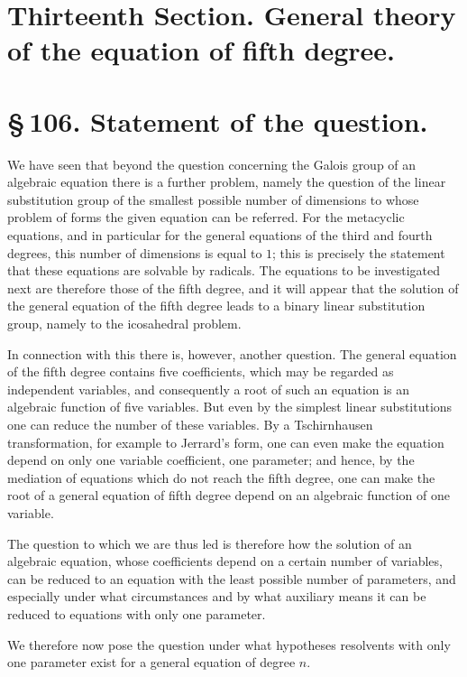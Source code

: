 \documentclass[11pt]{article}
\begin{document}
\section*{Thirteenth Section. General theory of the equation of fifth degree.}

\section*{\S\,106. Statement of the question.}

We have seen that beyond the question concerning the Galois group of an algebraic equation there is a further problem, namely the question of the linear substitution group of the smallest possible number of dimensions to whose problem of forms the given equation can be referred. For the metacyclic equations, and in particular for the general equations of the third and fourth degrees, this number of dimensions is equal to \(1\); this is precisely the statement that these equations are solvable by radicals. The equations to be investigated next are therefore those of the fifth degree, and it will appear that the solution of the general equation of the fifth degree leads to a binary linear substitution group, namely to the icosahedral problem.

In connection with this there is, however, another question. The general equation of the fifth degree contains five coefficients, which may be regarded as independent variables, and consequently a root of such an equation is an algebraic function of five variables. But even by the simplest linear substitutions one can reduce the number of these variables. By a Tschirnhausen transformation, for example to Jerrard's form, one can even make the equation depend on only one variable coefficient, one parameter; and hence, by the mediation of equations which do not reach the fifth degree, one can make the root of a general equation of fifth degree depend on an algebraic function of one variable.

The question to which we are thus led is therefore how the solution of an algebraic equation, whose coefficients depend on a certain number of variables, can be reduced to an equation with the least possible number of parameters, and especially under what circumstances and by what auxiliary means it can be reduced to equations with only one parameter.

We therefore now pose the question under what hypotheses resolvents with only one parameter exist for a general equation of degree \(n\).
\end{document}

